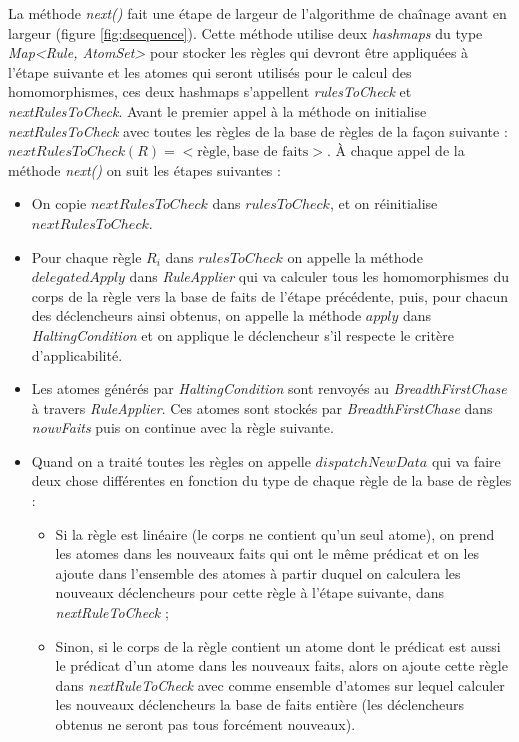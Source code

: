         La méthode \textit{next()} fait une étape de largeur de l'algorithme de chaînage avant en largeur (figure \ref{fig:dsequence}). Cette méthode utilise deux \textit{hashmaps} du type \textit{Map<Rule, AtomSet>} pour stocker les règles qui devront être appliquées à l'étape suivante et les atomes qui seront utilisés pour le calcul des homomorphismes, ces deux hashmaps s'appellent \textit{rulesToCheck} et \textit{nextRulesToCheck}. Avant le premier appel à la méthode on initialise \textit{nextRulesToCheck} avec toutes les règles de la base de règles de la façon suivante : $nextRulesToCheck({R}) = <\mbox{règle},\mbox{base de faits}> $. À chaque appel de la méthode \textit{next()} on suit les étapes suivantes : 
        \\
        
        \begin{itemize}
        \item On copie $nextRulesToCheck$ dans $rulesToCheck$, et on réinitialise $nextRulesToCheck$.
        \item Pour chaque règle $R_i$ dans $rulesToCheck$ on appelle la méthode $delegatedApply$ dans \textit{RuleApplier} qui va calculer tous les homomorphismes du corps de la règle vers la base de faits de l'étape précédente, puis, pour chacun des déclencheurs ainsi obtenus, on appelle la méthode $apply$ dans \textit{HaltingCondition} et on applique le déclencheur s'il respecte le critère d'applicabilité.
        \item Les atomes générés par \textit{HaltingCondition} sont renvoyés au \textit{BreadthFirstChase} à travers \textit{RuleApplier}. Ces atomes sont stockés par \textit{BreadthFirstChase} dans \textit{nouvFaits} puis on continue avec la règle suivante.
        \item Quand on a traité toutes les règles on appelle $dispatchNewData$ qui va faire deux chose différentes en fonction du type de chaque règle de la base de règles :
        \begin{itemize}
            \item Si la règle est linéaire (le corps ne contient qu'un seul atome), on prend les atomes dans les nouveaux faits qui ont le même prédicat et on les ajoute dans l'ensemble des atomes à partir duquel on calculera les nouveaux déclencheurs pour cette règle à l'étape suivante, dans \textit{nextRuleToCheck} ;
            \item Sinon, si le corps de la règle contient un atome dont le prédicat est aussi le prédicat d'un atome dans les nouveaux faits, alors on ajoute cette règle dans \textit{nextRuleToCheck} avec comme ensemble d'atomes sur lequel calculer les nouveaux déclencheurs la base de faits entière (les déclencheurs obtenus ne seront pas tous forcément nouveaux).
        \end{itemize}
        \end{itemize}
         

